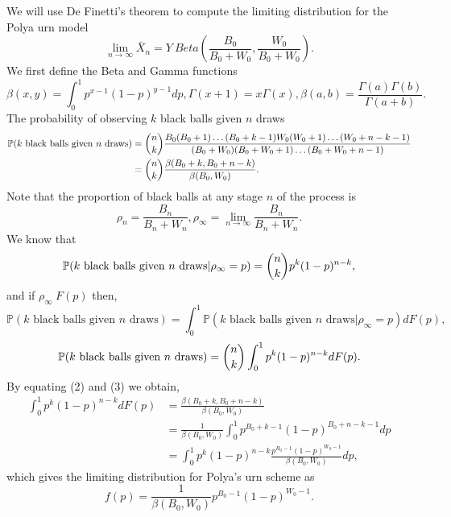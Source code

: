 \documentclass[a4paper,english,10pt]{article}
\begin{document}
We will use De Finetti's theorem to compute the limiting distribution for the Polya urn model 
\begin{equation*}
\lim_{n\to \infty} \bar{X}_n=Y~Beta\left(\frac{B_0}{B_0+W_0},\frac{W_0}{B_0+W_0} \right).
\end{equation*}
We first define the Beta and Gamma functions
\begin{equation*}
\beta(x,y)=\int_0^1 p^{x-1}(1-p)^{y-1}dp, \Gamma(x+1)=x\Gamma(x), \beta(a,b)=\frac{\Gamma(a)\Gamma(b)}{\Gamma(a+b)}.
\end{equation*}
The probability of observing $k$ black balls given $n$ draws
\begin{align}
\mathbb{P}(k \text{ black balls given } n \text{ draws})&=\dbinom{n}{k}\frac{B_0(B_0+1)\dots(B_0+k-1)W_0(W_0+1)\dots(W_0+n-k-1)}{(B_0+W_0)(B_0+W_0+1)\dots(B_0+W_0+n-1)}\\
								&=\dbinom{n}{k}\frac{\beta(B_0+k,B_0+n-k)}{\beta(B_0,W_0)}.
\end{align}
Note that the proportion of black balls at any stage $n$ of the process is
\begin{equation*}
\rho_n=\frac{B_n}{B_n+W_n}, \rho_{\infty}=\lim_{n\to \infty}\frac{B_n}{B_n+W_n}.
\end{equation*}
We know that 
\begin{equation*}
\mathbb{P}(k \text{ black balls given } n \text{ draws}|\rho_{\infty}=p)=\dbinom{n}{k}p^k(1-p)^{n-k},
\end{equation*}
and if $\rho_{\infty}~F(p)$ then,
\begin{equation*}
\mathbb{P}(k \text{ black balls given } n \text{ draws})=\int_0^1\mathbb{P}(k \text{ black balls given } n \text{ draws}|\rho_{\infty}=p)dF(p),
\end{equation*}
\begin{equation}
\mathbb{P}(k \text{ black balls given } n \text{ draws})=\dbinom{n}{k} \int_0^1p^k(1-p)^{n-k}dF(p).
\end{equation}
By equating (2) and (3) we obtain,
\begin{align*}
\int_0^1 p^k(1-p)^{n-k}dF(p) &= \frac{\beta(B_0+k,B_0+n-k)}{\beta(B_0,W_0)}\\
					   &=\frac{1}{\beta(B_0,W_0)}\int_0^1p^{B_0+k-1}(1-p)^{B_0+n-k-1}dp\\
					   &=\int_0^1 p^k (1-p)^{n-k}\frac{p^{B_0-1}(1-p)^{W_0-1}}{\beta(B_0,W_0)}dp,
\end{align*}
which gives the limiting distribution for Polya's urn scheme as
\begin{equation*}
f(p)=\frac{1}{\beta(B_0,W_0)}p^{B_0-1}(1-p)^{W_0-1}.
\end{equation*}
\end{document}
